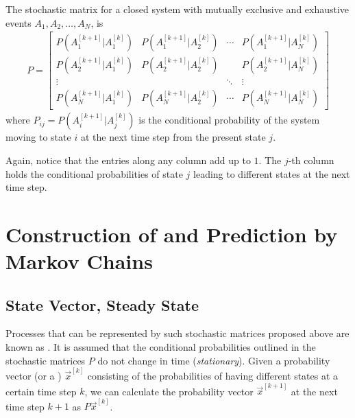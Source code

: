 \begin{defn}
\label{defn:stocmat}
The stochastic matrix for a closed system with mutually exclusive and exhaustive events $A_1, A_2, \ldots, A_N$, is
\begin{align}
P =
\begin{bmatrix}
P(A_1^{[k+1]}|A_1^{[k]}) & P(A_1^{[k+1]}|A_2^{[k]}) & \cdots & P(A_1^{[k+1]}|A_N^{[k]})\\[3pt]
P(A_2^{[k+1]}|A_1^{[k]}) & P(A_2^{[k+1]}|A_2^{[k]}) & & P(A_2^{[k+1]}|A_N^{[k]}) \\[3pt]
\vdots & & \ddots & \vdots \\[3pt]
P(A_N^{[k+1]}|A_1^{[k]}) & P(A_N^{[k+1]}|A_2^{[k]}) & \cdots & P(A_N^{[k+1]}|A_N^{[k]})
\end{bmatrix}
\label{eqn:stocP}
\end{align}
where $P_{ij} = P(A_i^{[k+1]}|A_j^{[k]})$ is the conditional probability of the system moving to state $i$ at the next time step from the present state $j$.
\end{defn}
Again, notice that the entries along any column add up to $1$. The $j$-th column holds the conditional probabilities of state $j$ leading to different states at the next time step.

\section{Construction of and Prediction by Markov Chains}

\subsection{State Vector, Steady State}

Processes that can be represented by such stochastic matrices proposed above are known as . It is assumed that the conditional probabilities outlined in the stochastic matrices $P$ do not change in time (\textit{stationary}). Given a probability vector (or a ) $\vec{x}^{[k]}$ consisting of the probabilities of having different states at a certain time step $k$, we can calculate the probability vector $\vec{x}^{[k+1]}$ at the next time step $k+1$ as $P\vec{x}^{[k]}$.

